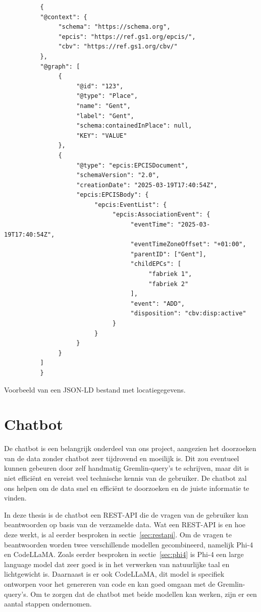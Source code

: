 \begin{listing}[H]
     \begin{verbatim}
          {
          "@context": {
               "schema": "https://schema.org",
               "epcis": "https://ref.gs1.org/epcis/",
               "cbv": "https://ref.gs1.org/cbv/"
          },
          "@graph": [
               {
                    "@id": "123",
                    "@type": "Place",
                    "name": "Gent",
                    "label": "Gent",
                    "schema:containedInPlace": null,
                    "KEY": "VALUE"
               },
               {
                    "@type": "epcis:EPCISDocument",
                    "schemaVersion": "2.0",
                    "creationDate": "2025-03-19T17:40:54Z",
                    "epcis:EPCISBody": {
                         "epcis:EventList": {
                              "epcis:AssociationEvent": {
                                   "eventTime": "2025-03-19T17:40:54Z",
                                   "eventTimeZoneOffset": "+01:00",
                                   "parentID": ["Gent"],
                                   "childEPCs": [
                                        "fabriek 1",
                                        "fabriek 2"
                                   ],
                                   "event": "ADD",
                                   "disposition": "cbv:disp:active"
                              }
                         }
                    }
               }
          ]
          }
     \end{verbatim}
     \caption[Voorbeeld JSON-LD bestand]{\label{fig:jsonld}Voorbeeld van een JSON-LD bestand met locatiegegevens.}
\end{listing}

\section{Chatbot}{\label{sec:chatbot}}
De chatbot is een belangrijk onderdeel van ons project, aangezien het doorzoeken van de data zonder chatbot zeer tijdrovend en moeilijk is.
Dit zou eventueel kunnen gebeuren door zelf handmatig Gremlin-query's te schrijven, maar dit is niet efficiënt en vereist veel technische kennis van de gebruiker.
De chatbot zal ons helpen om de data snel en efficiënt te doorzoeken en de juiste informatie te vinden.

In deze thesis is de chatbot een REST-API die de vragen van de gebruiker kan beantwoorden op basis van de verzamelde data.
Wat een REST-API is en hoe deze werkt, is al eerder besproken in sectie~\ref{sec:restapi}.
Om de vragen te beantwoorden worden twee verschillende modellen gecombineerd, namelijk Phi-4 en CodeLLaMA. 
Zoals eerder besproken in sectie~\ref{sec:phi4} is Phi-4 een large language model dat zeer goed is in het verwerken van natuurlijke taal en lichtgewicht is.
Daarnaast is er ook CodeLLaMA, dit model is specifiek ontworpen voor het genereren van code en kan goed omgaan met de Gremlin-query's.
Om te zorgen dat de chatbot met beide modellen kan werken, zijn er een aantal stappen ondernomen.

